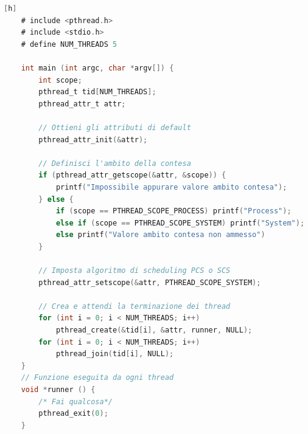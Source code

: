 \begin{lstlisting}[language=C][h]
    # include <pthread.h>
    # include <stdio.h>
    # define NUM_THREADS 5

    int main (int argc, char *argv[]) {
        int scope;
        pthread_t tid[NUM_THREADS];
        pthread_attr_t attr;

        // Ottieni gli attributi di default
        pthread_attr_init(&attr);

        // Definisci l'ambito della contesa
        if (pthread_attr_getscope(&attr, &scope)) {
            printf("Impossibile appurare valore ambito contesa");
        } else {
            if (scope == PTHREAD_SCOPE_PROCESS) printf("Process");
            else if (scope == PTHREAD_SCOPE_SYSTEM) printf("System");
            else printf("Valore ambito contesa non ammesso")
        }

        // Imposta algoritmo di scheduling PCS o SCS
        pthread_attr_setscope(&attr, PTHREAD_SCOPE_SYSTEM);

        // Crea e attendi la terminazione dei thread
        for (int i = 0; i < NUM_THREADS; i++)
            pthread_create(&tid[i], &attr, runner, NULL);
        for (int i = 0; i < NUM_THREADS; i++) 
            pthread_join(tid[i], NULL);
    }
    // Funzione eseguita da ogni thread
    void *runner () {
        /* Fai qualcosa*/
        pthread_exit(0);
    }    
\end{lstlisting}

%

